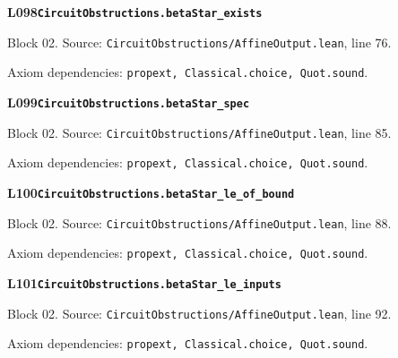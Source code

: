 \begin{minipage}{\linewidth}
\hypertarget{L098}{}
{\small\sffamily\bfseries\color{ink}L098\quad\nolinkurl{CircuitObstructions.betaStar_exists}}\par
{\scriptsize\sffamily\color{muted}Block 02. Source: \nolinkurl{CircuitObstructions/AffineOutput.lean}, line 76.}\par
{}
{\scriptsize\sffamily\color{muted}Axiom dependencies: \nolinkurl{propext, Classical.choice, Quot.sound}.}
\end{minipage}\par\medskip
{}\par\medskip
\begin{minipage}{\linewidth}
\hypertarget{L099}{}
{\small\sffamily\bfseries\color{ink}L099\quad\nolinkurl{CircuitObstructions.betaStar_spec}}\par
{\scriptsize\sffamily\color{muted}Block 02. Source: \nolinkurl{CircuitObstructions/AffineOutput.lean}, line 85.}\par
{}
{\scriptsize\sffamily\color{muted}Axiom dependencies: \nolinkurl{propext, Classical.choice, Quot.sound}.}
\end{minipage}\par\medskip
\begin{minipage}{\linewidth}
\hypertarget{L100}{}
{\small\sffamily\bfseries\color{ink}L100\quad\nolinkurl{CircuitObstructions.betaStar_le_of_bound}}\par
{\scriptsize\sffamily\color{muted}Block 02. Source: \nolinkurl{CircuitObstructions/AffineOutput.lean}, line 88.}\par
{}
{\scriptsize\sffamily\color{muted}Axiom dependencies: \nolinkurl{propext, Classical.choice, Quot.sound}.}
\end{minipage}\par\medskip
\begin{minipage}{\linewidth}
\hypertarget{L101}{}
{\small\sffamily\bfseries\color{ink}L101\quad\nolinkurl{CircuitObstructions.betaStar_le_inputs}}\par
{\scriptsize\sffamily\color{muted}Block 02. Source: \nolinkurl{CircuitObstructions/AffineOutput.lean}, line 92.}\par
{}
{\scriptsize\sffamily\color{muted}Axiom dependencies: \nolinkurl{propext, Classical.choice, Quot.sound}.}
\end{minipage}\par\medskip
